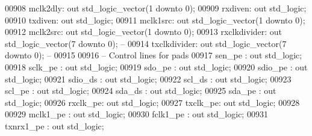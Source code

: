 \begin{DoxyCode}
00908         mclk2dly: \textcolor{keywordflow}{out} \textcolor{comment}{std\_logic\_vector}(\textcolor{vhdllogic}{}\textcolor{vhdllogic}{1} \textcolor{keywordflow}{downto} \textcolor{vhdllogic}{}\textcolor{vhdllogic}{0});
00909         rxdiven: \textcolor{keywordflow}{out} \textcolor{comment}{std\_logic};
00910         txdiven: \textcolor{keywordflow}{out} \textcolor{comment}{std\_logic};
00911         mclk1src: \textcolor{keywordflow}{out} \textcolor{comment}{std\_logic\_vector}(\textcolor{vhdllogic}{}\textcolor{vhdllogic}{1} \textcolor{keywordflow}{downto} \textcolor{vhdllogic}{}\textcolor{vhdllogic}{0});
00912         mclk2src: \textcolor{keywordflow}{out} \textcolor{comment}{std\_logic\_vector}(\textcolor{vhdllogic}{}\textcolor{vhdllogic}{1} \textcolor{keywordflow}{downto} \textcolor{vhdllogic}{}\textcolor{vhdllogic}{0});
00913         rxclkdivider: \textcolor{keywordflow}{out} \textcolor{comment}{std\_logic\_vector}(\textcolor{vhdllogic}{}\textcolor{vhdllogic}{7} \textcolor{keywordflow}{downto} \textcolor{vhdllogic}{}\textcolor{vhdllogic}{0});  \textcolor{keyword}{-- }
00914         txclkdivider: \textcolor{keywordflow}{out} \textcolor{comment}{std\_logic\_vector}(\textcolor{vhdllogic}{}\textcolor{vhdllogic}{7} \textcolor{keywordflow}{downto} \textcolor{vhdllogic}{}\textcolor{vhdllogic}{0});  \textcolor{keyword}{-- }
00915         
00916 \textcolor{keyword}{        -- Control lines for pads }
00917         sen\_pe  : \textcolor{keywordflow}{out} \textcolor{comment}{std\_logic};
00918         sclk\_pe : \textcolor{keywordflow}{out} \textcolor{comment}{std\_logic};
00919         sdo\_pe  : \textcolor{keywordflow}{out} \textcolor{comment}{std\_logic};
00920         sdio\_pe : \textcolor{keywordflow}{out} \textcolor{comment}{std\_logic};
00921         sdio\_ds : \textcolor{keywordflow}{out} \textcolor{comment}{std\_logic};
00922         scl\_ds  : \textcolor{keywordflow}{out} \textcolor{comment}{std\_logic};
00923         scl\_pe  : \textcolor{keywordflow}{out} \textcolor{comment}{std\_logic};
00924         sda\_ds  : \textcolor{keywordflow}{out} \textcolor{comment}{std\_logic};
00925         sda\_pe  : \textcolor{keywordflow}{out} \textcolor{comment}{std\_logic};
00926         rxclk\_pe: \textcolor{keywordflow}{out} \textcolor{comment}{std\_logic};
00927         txclk\_pe: \textcolor{keywordflow}{out} \textcolor{comment}{std\_logic};
00928     
00929         mclk1\_pe                : \textcolor{keywordflow}{out} \textcolor{comment}{std\_logic};
00930         fclk1\_pe                : \textcolor{keywordflow}{out} \textcolor{comment}{std\_logic};
00931         txnrx1\_pe               : \textcolor{keywordflow}{out} \textcolor{comment}{std\_logic};

\end{DoxyCode}
